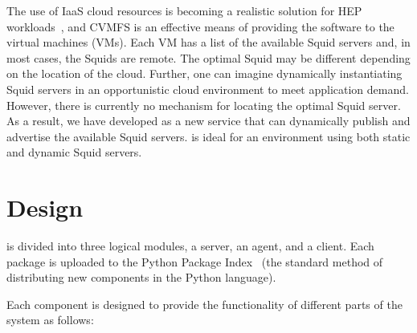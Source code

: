 \documentclass[a4paper]{jpconf}
\begin{document}
The use of IaaS cloud resources is becoming a realistic solution for
HEP workloads~\cite{ref:atlascloud, ref:batchcloud}, and CVMFS is an
effective means of providing the software to the virtual machines (VMs).
Each VM has a list of the available Squid servers and, in most cases,
the Squids are remote.
The optimal Squid may be different depending on the location of the cloud.
Further, one can imagine dynamically instantiating Squid servers in
an opportunistic cloud environment to meet application demand.
However, there is currently no mechanism for locating the optimal Squid server.
As a result, we have developed \shoal as a new service that can dynamically
publish and advertise the available Squid servers.
\shoal is ideal for an environment using both static and dynamic
Squid servers.

\section{Design}

\shoal is divided into three logical modules, a server, an agent, and a client. 
Each package is uploaded to the Python Package Index~\cite{ref:pypi} 
(the standard method of distributing new components in the Python language). 

Each component is designed to provide the functionality of different parts of the system as follows:
\end{document}
